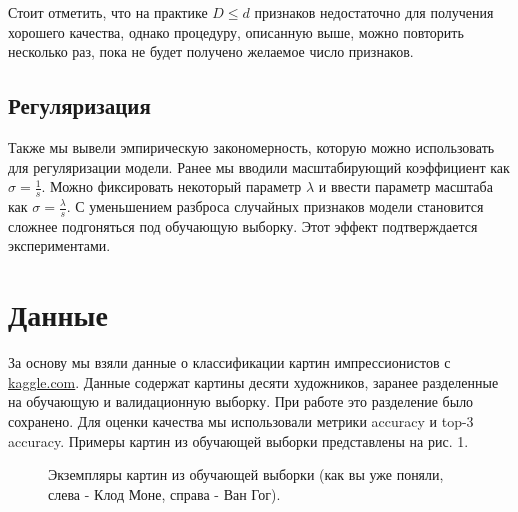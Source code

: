 \documentclass{article}
\newcommand{\bibref}[3]{#2\hyperlink{#1}{\color{blue}#3}}
\begin{document}
Стоит отметить, что на практике $D \le d$ признаков недостаточно для получения хорошего качества, однако процедуру, описанную выше, можно повторить несколько раз, пока не будет получено желаемое число признаков. 


\subsection{Регуляризация}

Также мы вывели эмпирическую закономерность, которую можно использовать для регуляризации модели. Ранее мы вводили масштабирующий коэффициент как $\sigma = \frac{1}{s}$. Можно фиксировать некоторый параметр $\lambda$ и ввести параметр масштаба как $\sigma = \frac{\lambda}{s}$. С уменьшением разброса случайных признаков модели становится сложнее подгоняться под обучающую выборку. Этот эффект подтверждается экспериментами.

\section{Данные}

За основу мы взяли данные о классификации картин импрессионистов с \bibref{kaggle}{}{kaggle.com}. Данные содержат картины десяти художников, заранее разделенные на обучающую и валидационную выборку. При работе это разделение было сохранено. Для оценки качества мы использовали метрики accuracy и top-3 accuracy. Примеры картин из обучающей выборки представлены на рис. 1.

\begin{figure}[H]
    \centering
    \caption{Экземпляры картин из обучающей выборки (как вы уже поняли, слева - Клод Моне, справа - Ван Гог).}
    \label{fig:my_label}
\end{figure}{}
\end{document}
